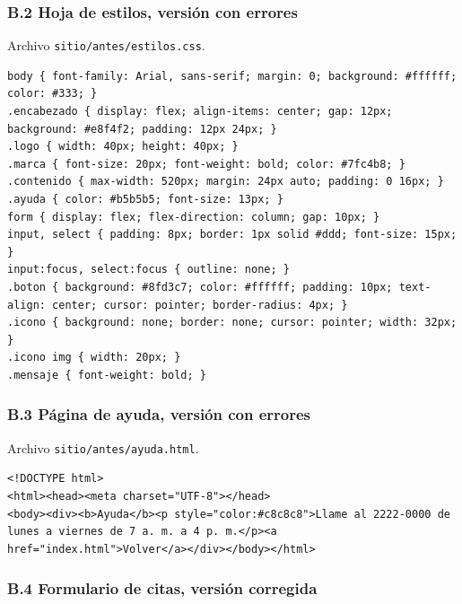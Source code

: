 \documentclass[10pt,letterpaper,onecolumn]{IEEEtran}
\begin{document}
\subsubsection{B.2 Hoja de estilos, versión con errores}\label{b.2-hoja-de-estilos-versiuxf3n-con-errores}

Archivo \texttt{sitio/\allowbreak{}\allowbreak{}antes/\allowbreak{}\allowbreak{}estilos.\allowbreak{}\allowbreak{}css}.

\begin{lstlisting}
body { font-family: Arial, sans-serif; margin: 0; background: #ffffff; color: #333; }
.encabezado { display: flex; align-items: center; gap: 12px; background: #e8f4f2; padding: 12px 24px; }
.logo { width: 40px; height: 40px; }
.marca { font-size: 20px; font-weight: bold; color: #7fc4b8; }
.contenido { max-width: 520px; margin: 24px auto; padding: 0 16px; }
.ayuda { color: #b5b5b5; font-size: 13px; }
form { display: flex; flex-direction: column; gap: 10px; }
input, select { padding: 8px; border: 1px solid #ddd; font-size: 15px; }
input:focus, select:focus { outline: none; }
.boton { background: #8fd3c7; color: #ffffff; padding: 10px; text-align: center; cursor: pointer; border-radius: 4px; }
.icono { background: none; border: none; cursor: pointer; width: 32px; }
.icono img { width: 20px; }
.mensaje { font-weight: bold; }
\end{lstlisting}

\subsubsection{B.3 Página de ayuda, versión con errores}\label{b.3-puxe1gina-de-ayuda-versiuxf3n-con-errores}

Archivo \texttt{sitio/\allowbreak{}\allowbreak{}antes/\allowbreak{}\allowbreak{}ayuda.\allowbreak{}\allowbreak{}html}.

\begin{lstlisting}
<!DOCTYPE html>
<html><head><meta charset="UTF-8"></head>
<body><div><b>Ayuda</b><p style="color:#c8c8c8">Llame al 2222-0000 de lunes a viernes de 7 a. m. a 4 p. m.</p><a href="index.html">Volver</a></div></body></html>
\end{lstlisting}

\subsubsection{B.4 Formulario de citas, versión corregida}\label{b.4-formulario-de-citas-versiuxf3n-corregida}
\end{document}
